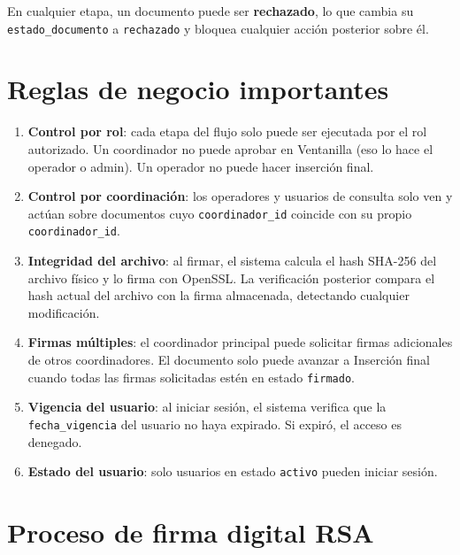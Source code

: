 \documentclass[10pt,letterpaper]{report}
\begin{document}
En cualquier etapa, un documento puede ser \textbf{rechazado}, lo que cambia su \texttt{estado\_documento} a \texttt{rechazado} y bloquea cualquier acción posterior sobre él.

\section{Reglas de negocio importantes}

\begin{enumerate}[label=\arabic*.]
  \item \textbf{Control por rol}: cada etapa del flujo solo puede ser ejecutada por el rol autorizado. Un coordinador no puede aprobar en Ventanilla (eso lo hace el operador o admin). Un operador no puede hacer inserción final.
  \item \textbf{Control por coordinación}: los operadores y usuarios de consulta solo ven y actúan sobre documentos cuyo \texttt{coordinador\_id} coincide con su propio \texttt{coordinador\_id}.
  \item \textbf{Integridad del archivo}: al firmar, el sistema calcula el hash SHA-256 del archivo físico y lo firma con OpenSSL. La verificación posterior compara el hash actual del archivo con la firma almacenada, detectando cualquier modificación.
  \item \textbf{Firmas múltiples}: el coordinador principal puede solicitar firmas adicionales de otros coordinadores. El documento solo puede avanzar a Inserción final cuando todas las firmas solicitadas estén en estado \texttt{firmado}.
  \item \textbf{Vigencia del usuario}: al iniciar sesión, el sistema verifica que la \texttt{fecha\_vigencia} del usuario no haya expirado. Si expiró, el acceso es denegado.
  \item \textbf{Estado del usuario}: solo usuarios en estado \texttt{activo} pueden iniciar sesión.
\end{enumerate}

\section{Proceso de firma digital RSA}
\end{document}
